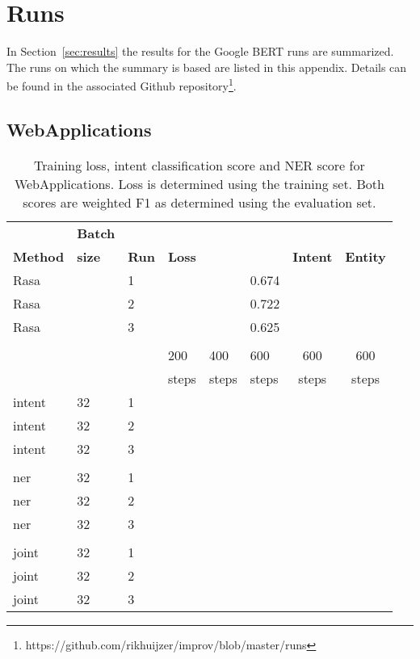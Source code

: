\chapter{Runs}
\label{ch:runs}

In Section~\ref{sec:results} the results for the Google BERT runs are summarized.
The runs on which the summary is based are listed in this appendix.
Details can be found in the associated Github repository\footnote{https://github.com/rikhuijzer/improv/blob/master/runs}.\\

\section{WebApplications}
\label{sec:runs_webapplications}
\begin{table}
    \centering
    \begin{tabular}{l l l l l l c c}
        & \textbf{Batch}\\
        \textbf{Method} & \textbf{size} & \textbf{Run} & \multicolumn{3}{l}{\textbf{Loss}} & \textbf{Intent} & \textbf{Entity} \\
        \hline
        Rasa & & 1 & & & 0.674 & \\
        Rasa & & 2 & & & 0.722 & \\
        Rasa & & 3 & & & 0.625 & \\
        \\
        & & & 200 & 400 & 600 & 600 & 600 \\
        & & & steps & steps & steps & steps & steps\\
        \hline
        intent & 32 & 1 & \scit{}{} & \scit{}{} & \scit{}{} &  &  \\
        intent & 32 & 2 & \scit{}{} & \scit{}{} & \scit{}{} &  &  \\
        intent & 32 & 3 &  &  &  &  &  \\
        \\
        ner & 32 & 1 & \scit{}{} & \scit{}{} & \scit{}{} &  &  \\
        ner & 32 & 2 & \scit{}{} & \scit{}{} & \scit{}{} &  &  \\
        ner & 32 & 3 & \scit{}{} & \scit{}{} & \scit{}{} &  &  \\
        \\
        joint & 32 & 1 & \scit{}{} & \scit{}{} & \scit{}{} &  &  \\
        joint & 32 & 2 & \scit{}{} & \scit{}{} & \scit{}{} &  &  \\
        joint & 32 & 3 & \scit{}{} & \scit{}{} & \scit{}{} &  &  \\
    \end{tabular}
    \caption{Training loss, intent classification score and NER score for WebApplications.
    Loss is determined using the training set.
    Both scores are weighted F1 as determined using the evaluation set.}
\end{table}

